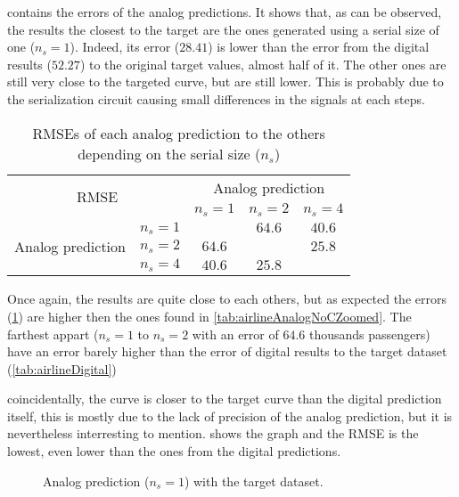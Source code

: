  contains the errors of the analog predictions. It shows that, as can be observed, the results the closest to the target are the ones generated using a serial size of one ($n_s=1$). Indeed, its error ($28.41$) is lower than the error from the digital results ($52.27$) to the original target values, almost half of it. The other ones are still very close to the targeted curve, but are still lower. This is probably due to the serialization circuit causing small differences in the signals at each steps.

\begin{table}[H]
  \centering
  \begin{tabular}{|c|c|c|c|c|}
    \hline
    \multicolumn{2}{|c}{\multirow{2}{*}{\ac{RMSE}}} & \multicolumn{3}{|c|}{Analog prediction}\\
    \cline{3-5}
    \multicolumn{2}{|c}{} & \multicolumn{1}{|c|}{$n_s=1$} & $n_s=2$ & $n_s=4$ \\
    \hline
    \multirow{3}{*}{Analog prediction} & $n_s=1$ &\cellcolor[HTML]{202020} & $64.6$ & $40.6$\\
    \cline{2-5}
    & $n_s=2$  & $64.6$ & \cellcolor[HTML]{202020} & $25.8$\\
    \cline{2-5}
    & $n_s=4$ & $40.6$ & $25.8$ & \cellcolor[HTML]{202020}\\
    \hline
  \end{tabular}
  \caption{\acp{RMSE} of each analog prediction to the others depending on the serial size ($n_s$)}
  \label{tab:airlineAnalogError}
\end{table}

Once again, the results are quite close to each others, but as expected the errors (\cref{tab:airlineAnalogError}) are higher then the ones found in \cref{tab:airlineAnalogNoCZoomed}. The farthest appart ($n_s=1$ to $n_s=2$ with an error of $64.6$ thousands passengers) have an error barely higher than the error of digital results to the target dataset (\cref{tab:airlineDigital})

coincidentally, the curve is closer to the target curve than the digital prediction itself, this is mostly due to the lack of precision of the analog prediction, but it is nevertheless interresting to mention.  shows the graph and the \ac{RMSE} is the lowest, even lower than the ones from the digital predictions.

\begin{figure}[H]
  \centering
  
  \caption{Analog prediction ($n_s=1$) with the target dataset.}
  \label{graph:airlineCoin}
\end{figure}


